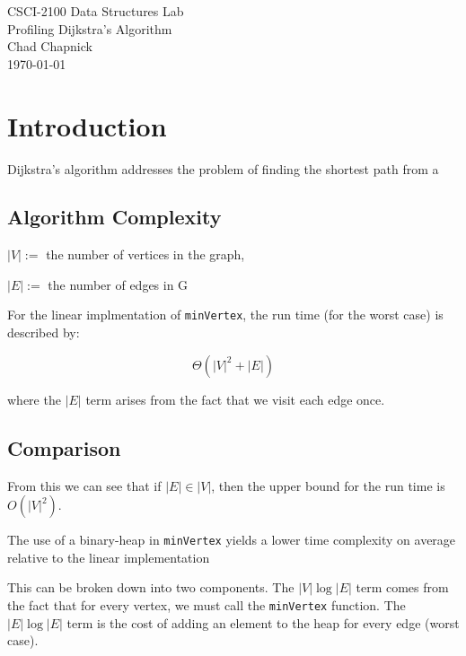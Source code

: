 \documentclass[technote]{IEEEtran}
\begin{document}
\begin{titlepage}
    \vspace*{\fill}
    \begin{center}
        {\Huge CSCI-2100 Data Structures Lab}\\[0.3cm]
        {\huge Profiling Dijkstra's Algorithm}\\[0.6cm]
        {\Large Chad Chapnick}\\[0.4cm]
        {\small\today}
    \end{center}
    \vspace*{\fill}
\end{titlepage}
\section{Introduction}

Dijkstra's algorithm addresses the problem of finding the shortest
path from a 

\subsection{Algorithm Complexity}

$|V| :=$ the number of vertices in the graph,  

$|E| :=$ the number of edges in G

For the linear implmentation of \texttt{minVertex}, the run time (for the worst case) 
is described by:

$$\Theta(|V|^2 + |E|)$$

where the $|E|$ term arises from the fact that we visit each edge once.

\subsection{Comparison}

From this we can see that if $|E| \in |V|$, 
then the upper bound for the run time is $O(|V|^2)$.


The use of a binary-heap in \texttt{minVertex} yields a 
lower time complexity on average relative to the linear implementation




This can be broken down into two components. 
The $|V|\log|E|$ term comes from the fact that for every vertex, 
we must call the \texttt{minVertex} function.
The $|E|\log|E|$ term is the cost of adding an element to the 
heap for every edge (worst case).
\end{document}
